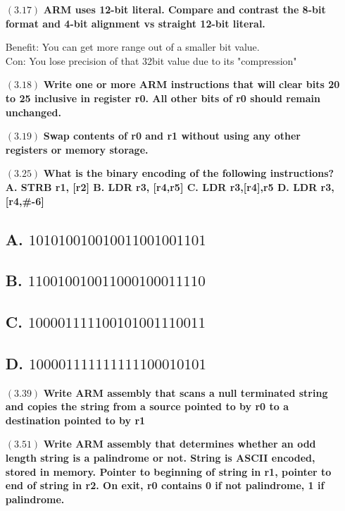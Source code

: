 \documentclass[letterpaper,10pt,titlepage]{article}
\def\braces#1{[#1]}
\begin{document}
\begin{enumerate}
\item[$(3.17)$] \textbf{ARM uses 12-bit literal. Compare and contrast the 8-bit format and 4-bit alignment vs straight 12-bit literal.}

Benefit: You can get more range out of a smaller bit value.\\
Con: You lose precision of that 32bit value due to its "compression"
  
\item[$(3.18)$] \textbf{Write one or more ARM instructions that will clear bits 20 to 25 inclusive in register r0. All other bits of r0 should remain unchanged.}


\item[$(3.19)$] \textbf{Swap contents of r0 and r1 without using any other registers or memory storage.}


\item[$(3.25)$] \textbf{What is the binary encoding of the following instructions? A. STRB r1, \braces{r2} B. LDR r3, \braces{r4,r5}\! C. LDR r3,\braces{r4},r5 D. LDR r3, \braces{r4,\#-6}\!}
\subsection*{A. $101010010010011001001101$}
\subsection*{B. $110010010011000100011110$}
\subsection*{C. $100001111100101001110011$}
\subsection*{D. $100001111111111100010101$}

\item[$(3.39)$] \textbf{Write ARM assembly that scans a null terminated string and copies the string from a source pointed to by r0 to a destination pointed to by r1}



\item[$(3.51)$] \textbf{Write ARM assembly that determines whether an odd length string is a palindrome or not. String is ASCII encoded, stored in memory. Pointer to beginning of string in r1, pointer to end of string in r2. On exit, r0 contains 0 if not palindrome, 1 if palindrome.}


\end{enumerate}
\end{document}
